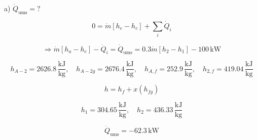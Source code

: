 a) $\dot{Q}_{\text{ums}} = ?$

\[
0 = \dot{m} [h_e - h_c] + \sum_i \dot{Q}_i
\]

\[
\Rightarrow \dot{m} [h_a - h_e] - \dot{Q}_i = \dot{Q}_{\text{ums}} = 0.3 \dot{m} [h_2 - h_1] - 100 \, \text{kW}
\]

\[
h_{A-2} = 2626.8 \, \frac{\text{kJ}}{\text{kg}}, \quad h_{A-2g} = 2676.4 \, \frac{\text{kJ}}{\text{kg}}, \quad h_{A,f} = 252.9 \, \frac{\text{kJ}}{\text{kg}}, \quad h_{2,f} = 419.04 \, \frac{\text{kJ}}{\text{kg}}
\]

\[
h = h_f + x (h_{fg})
\]

\[
h_1 = 304.65 \, \frac{\text{kJ}}{\text{kg}}, \quad h_2 = 436.33 \, \frac{\text{kJ}}{\text{kg}}
\]

\[
\dot{Q}_{\text{ums}} = -62.3 \, \text{kW}
\]
